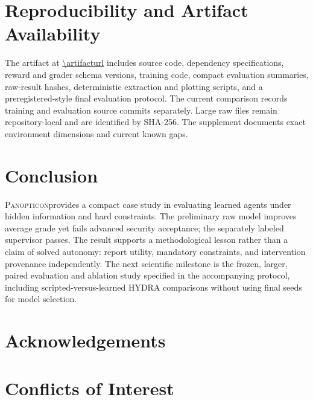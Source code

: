 \documentclass[11pt]{article}
\newcommand{\system}{\textsc{Panopticon}}
\begin{document}
\section{Reproducibility and Artifact Availability}

The artifact at \url{\artifacturl} includes source code, dependency specifications, reward and grader schema versions, training code, compact evaluation summaries, raw-result hashes, deterministic extraction and plotting scripts, and a preregistered-style final evaluation protocol. The current comparison records training and evaluation source commits separately. Large raw files remain repository-local and are identified by SHA-256. The supplement documents exact environment dimensions and current known gaps.

\section{Conclusion}

\system provides a compact case study in evaluating learned agents under hidden information and hard constraints. The preliminary raw model improves average grade yet fails advanced security acceptance; the separately labeled supervisor passes. The result supports a methodological lesson rather than a claim of solved autonomy: report utility, mandatory constraints, and intervention provenance independently. The next scientific milestone is the frozen, larger, paired evaluation and ablation study specified in the accompanying protocol, including scripted-versus-learned HYDRA comparisons without using final seeds for model selection.

\section*{Acknowledgements}
\fundingstatement

\section*{Conflicts of Interest}
\conflictstatement




\clearpage
\appendix

\end{document}

